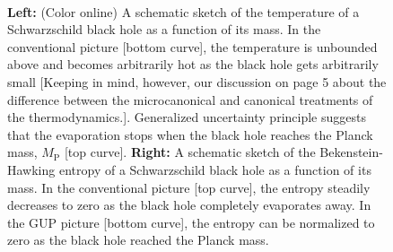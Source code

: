 \documentclass[12pt]{article}
\newcommand{\2}{$^2$}
\newcommand{\3}{$^3$}
\newcommand{\4}{$_4$}
\newcommand{\5}{$_5$}
\begin{document}
\begin{figure}[!h]
\centering
\mbox{\quad
{}}
\caption{\textbf{Left:} (Color online) A schematic sketch of the temperature of a Schwarzschild black hole as a function of its mass. In the conventional picture [bottom curve], the temperature is unbounded above and becomes arbitrarily hot as the black hole gets arbitrarily small [Keeping in mind, however, our discussion on page 5 about the difference between the microcanonical and canonical treatments of the thermodynamics.]. Generalized uncertainty principle suggests that the evaporation stops when the black hole reaches the Planck mass, $M_\text{P}$ [top curve]. \textbf{Right:} A schematic sketch of the Bekenstein-Hawking entropy of a Schwarzschild black hole as a function of its mass. In the conventional picture [top curve], the entropy steadily decreases to zero as the black hole completely evaporates away. In the GUP picture [bottom curve], the entropy can be normalized to zero as the black hole reached the Planck mass. \label{GUPeffect}}
\end{figure}
\end{document}
